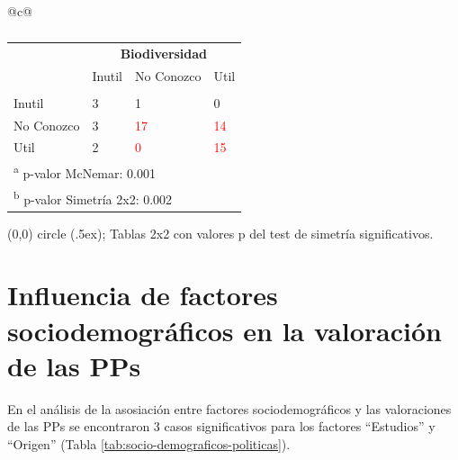 \documentclass[a4paper, nobind]{templates/ociamthesis}
\begin{document}
\begin{table}[hbtp]
\begin{threeparttable}
\begin{tabular}{@{}c@{}}
\begin{minipage}{\textwidth}
\begin{subtable}[c]{\textwidth}
\begin{tabular}{llll}
\toprule
\multicolumn{1}{c}{\textbf{ }} & \multicolumn{3}{c}{\textbf{Biodiversidad}} \\
  & Inutil & No Conozco & Util\\
\midrule
\addlinespace[0.3em]
\multicolumn{4}{l}{\textbf{Aves}}\\
\hspace{1em}Inutil & 3 & 1 & 0\\
\hspace{1em}No Conozco & 3 & \textcolor{red}{17} & \textcolor{red}{14}\\
\hspace{1em}Util & 2 & \textcolor{red}{0} & \textcolor{red}{15}\\
\bottomrule
\multicolumn{4}{l}{\textsuperscript{a} p-valor McNemar: 0.001}\\
\multicolumn{4}{l}{\textsuperscript{b} p-valor Simetría 2x2: 0.002}\\
\end{tabular}
        \caption{}
        \label{tab:aves-biodiversidad}
        \end{subtable}
\bigskip
        \begin{tablenotes}
        \item[] \tikz\draw[red,fill=red] (0,0) circle (.5ex); Tablas 2x2 con valores p del test de simetría significativos.
        \end{tablenotes}
      \end{minipage}
    \end{tabular} %
\end{threeparttable}
\end{table}

\hypertarget{sociodemo-pps}{%
\section{Influencia de factores sociodemográficos en la valoración de las PPs}\label{sociodemo-pps}}

En el análisis de la asosiación entre factores sociodemográficos y las valoraciones de las PPs se encontraron 3 casos significativos para los factores ``Estudios'' y ``Origen'' (Tabla \ref{tab:socio-demograficos-politicas}).
\end{document}
